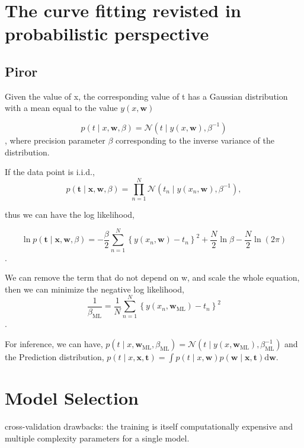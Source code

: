 \documentclass{article}
\begin{document}
\section{The curve fitting revisted in probabilistic perspective}
\subsection{Piror}
Given the value of x, the corresponding value of t has a Gaussian distribution with a mean equal to the value $y(x, \mathbf{w})$

$$p(t \mid x, \mathbf{w}, \beta)=\mathcal{N}\left(t \mid y(x, \mathbf{w}), \beta^{-1}\right)$$,
where precision parameter $\beta$ corresponding to the inverse variance of the distribution.

If the data point is i.i.d.,
$$p(\mathbf{t} \mid \mathbf{x}, \mathbf{w}, \beta)=\prod_{n=1}^{N} \mathcal{N}\left(t_{n} \mid y\left(x_{n}, \mathbf{w}\right), \beta^{-1}\right),$$

thus we can have the log likelihood,

$$\ln p(\mathbf{t} \mid \mathbf{x}, \mathbf{w}, \beta)=-\frac{\beta}{2} \sum_{n=1}^{N}\left\{y\left(x_{n}, \mathbf{w}\right)-t_{n}\right\}^{2}+\frac{N}{2} \ln \beta-\frac{N}{2} \ln (2 \pi)$$.

We can remove the term that do not depend on w, and scale the whole equation, then we can minimize the negative log likelihood,
$$\frac{1}{\beta_{\mathrm{ML}}}=\frac{1}{N} \sum_{n=1}^{N}\left\{y\left(x_{n}, \mathbf{w}_{\mathrm{ML}}\right)-t_{n}\right\}^{2}$$.

For inference, we can have,
$
p\left(t \mid x, \mathbf{w}_{\mathrm{ML}}, \beta_{\mathrm{ML}}\right)=\mathcal{N}\left(t \mid y\left(x, \mathbf{w}_{\mathrm{ML}}\right), \beta_{\mathrm{ML}}^{-1}\right)
$
and the Prediction distribution, 
$
p(t \mid x, \mathbf{x}, \mathbf{t})=\int p(t \mid x, \mathbf{w}) p(\mathbf{w} \mid \mathbf{x}, \mathbf{t}) \mathrm{d} \mathbf{w}
$.

\section{Model Selection}
cross-validation drawbacks: the training is itself computationally expensive and multiple complexity parameters for a single model.
\end{document}
